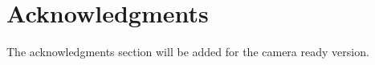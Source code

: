 \documentclass[conference]{IEEEtran}
\begin{document}


\section*{Acknowledgments}
The acknowledgments section will be added for the camera ready version. 







%
%
%







\end{document}
